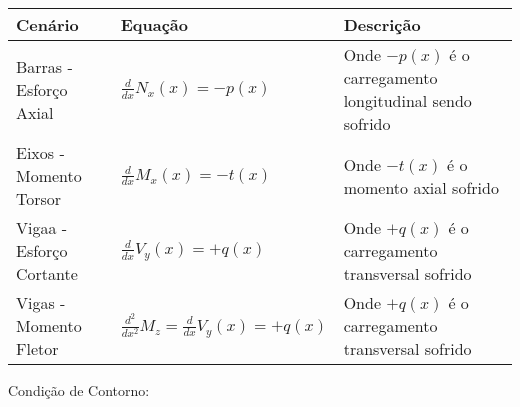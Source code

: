 \documentclass{article}
\begin{document}
        \begin{table}[h]\tiny
            
        \begin{tabularx}{\textwidth}{|X|X|X|}\hline
                \textbf{Cenário} & \textbf{Equação} & \textbf{Descrição}\\ \hline
                \rule{0pt}{4ex} Barras - Esforço Axial & $\frac{d}{dx}N_x(x) = -p(x)$ & Onde $-p(x)$ é o carregamento longitudinal sendo sofrido \\[2ex]  \hline
                \rule{0pt}{4ex} Eixos - Momento Torsor   & $\frac{d}{dx}M_x(x) = -t(x)$ & Onde $-t(x)$ é o momento axial sofrido \\[2ex]\hline
                \rule{0pt}{4ex} Vigaa - Esforço Cortante & $\frac{d}{dx}V_y(x) = +q(x)$ & Onde $+q(x)$ é o carregamento transversal sofrido \\[2ex] \hline
                \rule{0pt}{4ex} Vigas - Momento Fletor & $\frac{d^2}{dx^2}M_z = \frac{d}{dx}V_y(x) = +q(x)$ & Onde $+q(x)$ é o carregamento transversal sofrido \\[2ex] \hline
        \end{tabularx}

        \end{table}
        Condição de Contorno:

        
\end{document}
